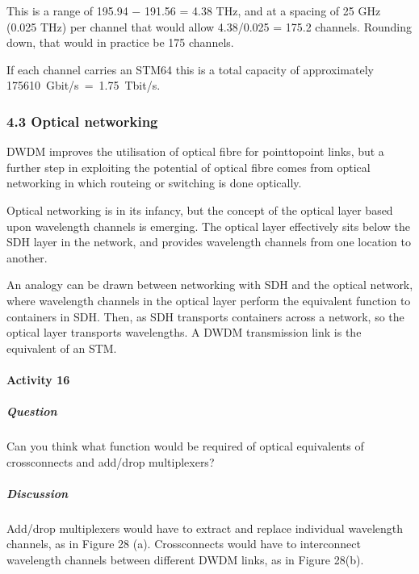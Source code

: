 \documentclass[letterpaper,10pt,english]{sphinxmanual}
\let\sphinxpxdimen\pdfpxdimen\else\newdimen\sphinxpxdimen
\begin{document}
\sphinxincludegraphics[width=511\sphinxpxdimen,height=127\sphinxpxdimen]{{ue005i}.gif}

This is a range of 195.94 − 191.56 = 4.38 THz, and at a spacing of 25 GHz (0.025 THz) per channel that would allow 4.38/0.025 = 175.2 channels. Rounding down, that would in practice be 175 channels.

If each channel carries an STM\sphinxhyphen{}64 this is a total capacity of approximately 175610 Gbit/s = 1.75 Tbit/s.


\subsubsection{4.3 Optical networking}
\label{\detokenize{content/session_00/Part_00_04:4.3-Optical-networking}}
DWDM improves the utilisation of optical fibre for point\sphinxhyphen{}to\sphinxhyphen{}point links, but a further step in exploiting the potential of optical fibre comes from optical networking in which routeing or switching is done optically.

Optical networking is in its infancy, but the concept of the optical layer based upon wavelength channels is emerging. The optical layer effectively sits below the SDH layer in the network, and provides wavelength channels from one location to another.

An analogy can be drawn between networking with SDH and the optical network, where wavelength channels in the optical layer perform the equivalent function to containers in SDH. Then, as SDH transports containers across a network, so the optical layer transports wavelengths. A DWDM transmission link is the equivalent of an STM\sphinxhyphen{}.


\paragraph{Activity 16}
\label{\detokenize{content/session_00/Part_00_04:Activity-16}}

\subparagraph{Question}
\label{\detokenize{content/session_00/Part_00_04:id6}}
Can you think what function would be required of optical equivalents of cross\sphinxhyphen{}connects and add/drop multiplexers?


\subparagraph{Discussion}
\label{\detokenize{content/session_00/Part_00_04:id7}}
Add/drop multiplexers would have to extract and replace individual wavelength channels, as in Figure 28 (a). Cross\sphinxhyphen{}connects would have to interconnect wavelength channels between different DWDM links, as in Figure 28(b).
\end{document}
